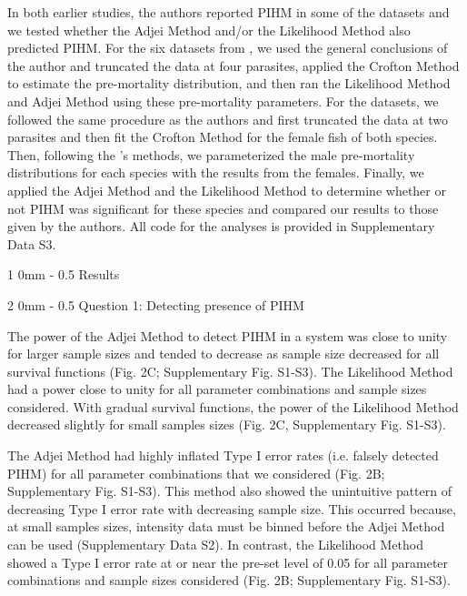 \documentclass[12pt, a4paper]{article}
\makeatletter
\renewcommand{\section}{\@startsection
{section}%
{1}%
{0mm}%
{-\baselineskip}%
{0.5\baselineskip}%
{\normalfont\bf\large}} %
\renewcommand{\subsection}{\@startsection
{subsection}%
{2}%
{0mm}%
{-\baselineskip}%
{0.5\baselineskip}%
{\normalfont\bf}} %
\makeatother
\begin{document}
In both earlier studies, the authors reported PIHM in some of the datasets and we tested whether the Adjei
Method and/or the Likelihood Method also predicted PIHM. For the six datasets from
\cite{Crofton1971a}, we used the general conclusions of the author and truncated the data at four parasites, applied the Crofton
Method to estimate the pre-mortality distribution, and then ran the Likelihood
Method and Adjei Method using these pre-mortality parameters.  For the
\cite{Adjei1986} datasets, we followed the same procedure as the authors and
first truncated the data at two parasites and then fit the Crofton Method for the
female fish of both species.  Then, following the \citeauthor{Adjei1986}'s methods, we parameterized the male pre-mortality
distributions for each species with the results from the females.  Finally, we
applied the Adjei Method and the Likelihood Method to determine whether or not
PIHM was significant for these species and compared our results to those given by the authors.  All code for the analyses is provided in Supplementary Data S3.

\section{Results}

\subsection{Question 1: Detecting presence of PIHM}

The power of the Adjei Method to detect PIHM in a
system was close to unity for larger sample sizes and tended to
decrease as sample size decreased for all survival functions (Fig. 2C; Supplementary Fig. S1-S3).  The Likelihood Method had a power close to
unity for all parameter combinations and sample sizes considered.  With gradual
survival functions, the power of the Likelihood Method decreased slightly for small samples sizes (Fig. 2C, Supplementary Fig. S1-S3).

The Adjei Method had highly inflated Type I error rates (i.e. falsely detected
PIHM) for all parameter combinations that we
considered (Fig. 2B; Supplementary Fig. S1-S3).  This method also showed the unintuitive pattern of decreasing Type I error
rate with decreasing sample size.  This occurred because, at small samples sizes, intensity data must be binned before the Adjei Method can be used (Supplementary Data S2).  In contrast, the Likelihood Method showed a Type I
error rate at or near the pre-set level of 0.05 for all parameter combinations
and sample sizes considered (Fig. 2B; Supplementary Fig. S1-S3).
\end{document}
